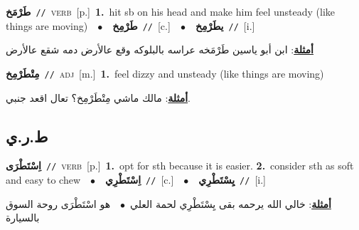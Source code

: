 \documentclass[10pt,a4paper,twoside]{article} %
\begin{document}
\begin{multicols}{2}
{\setlength\topsep{0pt}\textbf{\foreignlanguage{arabic}{طَرْمَخ}}\ {\color{gray}\texttt{//}\color{black}}\ \textsc{verb}\ [p.]\ \textbf{1.}~hit sb on his head and make him feel unsteady (like things are moving)\ \ $\bullet$\ \ \setlength\topsep{0pt}\textbf{\foreignlanguage{arabic}{طَرْمِخ}}\ {\color{gray}\texttt{//}\color{black}}\ [c.]\ \ $\bullet$\ \ \setlength\topsep{0pt}\textbf{\foreignlanguage{arabic}{يطَرْمِخ}}\ {\color{gray}\texttt{//}\color{black}}\ [i.]\  \begin{flushright}\color{gray}\foreignlanguage{arabic}{\textbf{\underline{\foreignlanguage{arabic}{أمثلة}}}: ابن أبو ياسين طَرْمَخه عراسه بالبلوكه وقع عالأرض دمه شقع عالأرض}\end{flushright}\color{black}} \vspace{2mm}

{\setlength\topsep{0pt}\textbf{\foreignlanguage{arabic}{مِتْطَرْمِخ}}\ {\color{gray}\texttt{//}\color{black}}\ \textsc{adj}\ [m.]\ \textbf{1.}~feel dizzy and unsteady (like things are moving)\  \begin{flushright}\color{gray}\foreignlanguage{arabic}{\textbf{\underline{\foreignlanguage{arabic}{أمثلة}}}: مالك ماشي مِتْطَرْمِخ؟ تعال اقعد جنبي.}\end{flushright}\color{black}} \vspace{2mm}

\vspace{-3mm}
\subsection*{\color{blue}\foreignlanguage{arabic}{ط.ر.ي}\color{blue}{}} 

{\setlength\topsep{0pt}\textbf{\foreignlanguage{arabic}{اِسْتَطْرَى}}\ {\color{gray}\texttt{//}\color{black}}\ \textsc{verb}\ [p.]\ \textbf{1.}~opt for sth because it is easier.  \textbf{2.}~consider sth as soft and easy to chew\ \ $\bullet$\ \ \setlength\topsep{0pt}\textbf{\foreignlanguage{arabic}{اِسْتَطْرِي}}\ {\color{gray}\texttt{//}\color{black}}\ [c.]\ \ $\bullet$\ \ \setlength\topsep{0pt}\textbf{\foreignlanguage{arabic}{يِسْتَطْرِي}}\ {\color{gray}\texttt{//}\color{black}}\ [i.]\  \begin{flushright}\color{gray}\foreignlanguage{arabic}{\textbf{\underline{\foreignlanguage{arabic}{أمثلة}}}: خالي الله يرحمه بقى يِسْتَطْرِي لحمة العلي\ $\bullet$\ \  هو اسْتَطْرَى روحة السوق بالسيارة}\end{flushright}\color{black}} \vspace{2mm}


\end{multicols}
\end{document}
